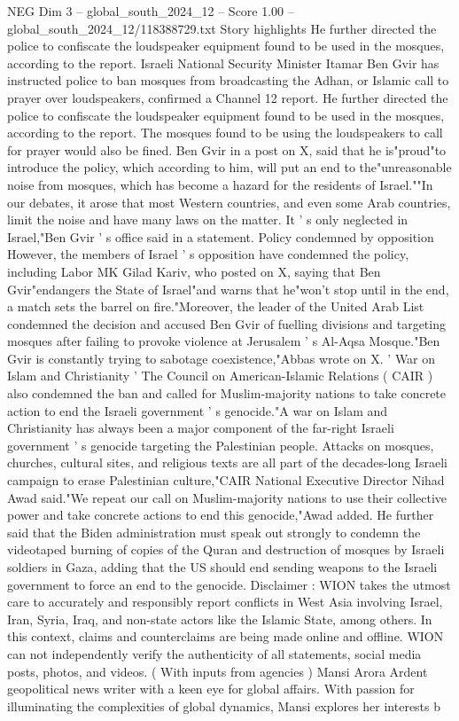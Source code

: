 \begin{textsample}{NEG Dim 3 – global\_south\_2024\_12 – Score 1.00 – global\_south\_2024\_12/118388729.txt}  \label{ex:f3_neg_070}
Story highlights He further directed the police to confiscate the loudspeaker equipment found to be used in the mosques, according to the report.
Israeli National Security Minister Itamar Ben Gvir has instructed police to ban mosques from broadcasting the Adhan, or Islamic call to prayer over loudspeakers, confirmed a Channel 12 report.
He further directed the police to confiscate the loudspeaker equipment found to be used in the mosques, according to the report.
The mosques found to be using the loudspeakers to call for prayer would also be fined.
Ben Gvir in a post on X, said that he is"proud"to introduce the policy, which according to him, will put an end to the"unreasonable noise from mosques, which has become a hazard for the residents of Israel.""In our debates, it arose that most Western countries, and even some Arab countries, limit the noise and have many laws on the matter.
It ' s only neglected in Israel,"Ben Gvir ' s office said in a statement.
Policy condemned by opposition However, the members of Israel ' s opposition have condemned the policy, including Labor MK Gilad Kariv, who posted on X, saying that Ben Gvir"endangers the State of Israel"and warns that he"won't stop until in the end, a match sets the barrel on fire."Moreover, the leader of the United Arab List condemned the decision and accused Ben Gvir of fuelling divisions and targeting mosques after failing to provoke violence at Jerusalem ' s Al-Aqsa Mosque."Ben Gvir is constantly trying to sabotage coexistence,"Abbas wrote on X. ' War on Islam and Christianity ' The Council on American-Islamic Relations ( CAIR ) also condemned the ban and called for Muslim-majority nations to take concrete action to end the Israeli government ' s genocide."A war on Islam and Christianity has always been a major component of the far-right Israeli government ' s genocide targeting the Palestinian people.
Attacks on mosques, churches, cultural sites, and religious texts are all part of the decades-long Israeli campaign to erase Palestinian culture,"CAIR National Executive Director Nihad Awad said."We repeat our call on Muslim-majority nations to use their collective power and take concrete actions to end this genocide,"Awad added.
He further said that the Biden administration must speak out strongly to condemn the videotaped burning of copies of the Quran and destruction of mosques by Israeli soldiers in Gaza, adding that the US should end sending weapons to the Israeli government to force an end to the genocide.
Disclaimer : WION takes the utmost care to accurately and responsibly report conflicts in West Asia involving Israel, Iran, Syria, Iraq, and non-state actors like the Islamic State, among others.
In this context, claims and counterclaims are being made online and offline.
WION can not independently verify the authenticity of all statements, social media posts, photos, and videos. ( With inputs from agencies ) Mansi Arora Ardent geopolitical news writer with a keen eye for global affairs.
With passion for illuminating the complexities of global dynamics, Mansi explores her interests b

\end{textsample}
